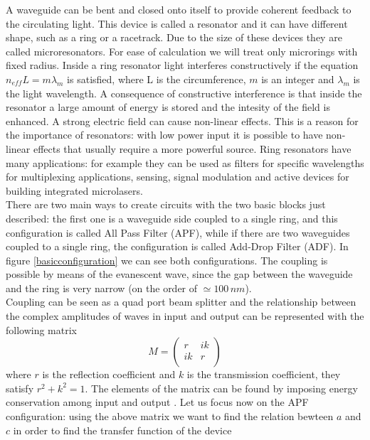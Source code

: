 A waveguide can be bent and closed onto itself to provide coherent feedback to the circulating light. This device is called a resonator and it can have different shape, such as a ring or a racetrack. Due to the size of these devices they are called microresonators. For ease of calculation we will treat only microrings with fixed radius. Inside a ring resonator light interferes constructively if the equation $n_{eff} L = m \lambda_m$ is satisfied, where L is the circumference, $m$ is an integer and $\lambda_m$ is the light wavelength. A consequence of constructive interference is that inside the resonator a large amount of energy is stored and the intesity of the field is enhanced. A strong electric field can cause non-linear effects. This is a reason for the importance of resonators: with low power input it is possible to have non-linear effects that usually require a more powerful source. Ring resonators have many applications: for example they can be used as filters for specific wavelengths for multiplexing applications, sensing, signal modulation and active devices for building integrated microlasers.\\
There are two main ways to create circuits with the two basic blocks just described: the first one is a waveguide side coupled to a single ring, and this configuration is called All Pass Filter (APF), while if there are two waveguides coupled to a single ring, the configuration is called Add-Drop Filter (ADF). In figure \ref{basicconfiguration} we can see both configurations. The coupling is possible by means of the evanescent wave, since the gap between the waveguide and the ring is very narrow (on the order of $\simeq 100\, nm$).\\
Coupling can be seen as a quad port beam splitter and the relationship between the complex amplitudes of waves in input and output can be represented with the following matrix
\begin{equation}M = \begin{pmatrix}
r & ik \\
ik & r\\
\end{pmatrix}\end{equation}
where $r$ is the reflection coefficient and $k$ is the transmission coefficient, they satisfy $r^2 +k^2 = 1$. The elements of the matrix can be found by imposing energy conservation among input and output \cite{thesis:masi}. Let us focus now on the APF configuration: using the above matrix we want to find the relation bewteen $a$ and $c$ in order to find the transfer function of the device
